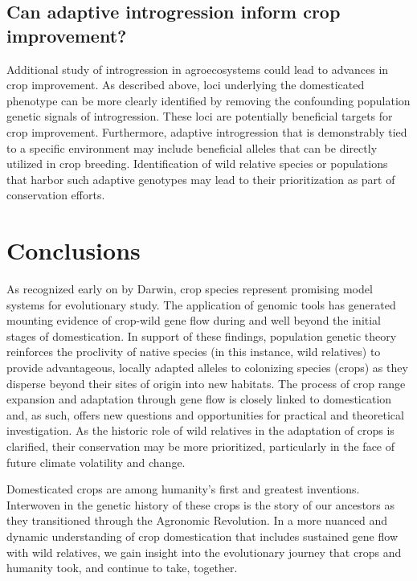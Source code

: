 \documentclass[11pt]{article}
\begin{document}
\subsection*{Can adaptive introgression inform crop improvement?}

Additional study of introgression in agroecosystems could lead to advances in crop improvement.
As described above, loci underlying the domesticated phenotype can be more clearly identified by removing the confounding population genetic signals of introgression.
These loci are potentially beneficial targets for crop improvement.
Furthermore, adaptive introgression that is demonstrably tied to a specific environment may include beneficial alleles that can be directly utilized in crop breeding.
Identification of wild relative species or populations that harbor such adaptive genotypes may lead to their prioritization as part of conservation efforts.


\section*{Conclusions}

As recognized early on by Darwin, crop species represent promising model systems for evolutionary study. 
The application of genomic tools has generated mounting evidence of crop-wild gene flow during and well beyond the initial stages of domestication.
In support of these findings, population genetic theory reinforces the proclivity of native species (in this instance, wild relatives) to provide advantageous, locally adapted alleles to colonizing species (crops) as they disperse beyond their sites of origin into new habitats.
The process of crop range expansion and adaptation through gene flow is closely linked to domestication and, as such, offers new questions and opportunities for practical and theoretical investigation.
As the historic role of wild relatives in the adaptation of crops is clarified, their conservation may be more prioritized, particularly in the face of future climate volatility and change.

Domesticated crops are among humanity's first and greatest inventions.
Interwoven in the genetic history of these crops is the story of our ancestors as they transitioned through the Agronomic Revolution.
In a more nuanced and dynamic understanding of crop domestication that includes sustained gene flow with wild relatives, we gain insight into the evolutionary journey that crops and humanity took, and continue to take, together.
\end{document}

